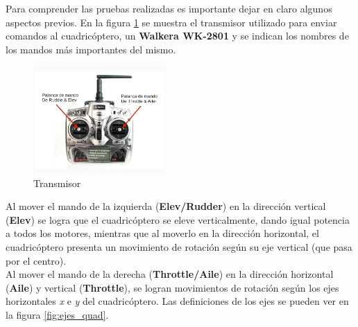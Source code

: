 \documentclass[spanish,12pt,a4paper,titlepage]{report}
\begin{document}
Para comprender las pruebas realizadas es importante dejar en claro algunos aspectos previos. En la figura \ref{fig:tx} se muestra el transmisor utilizado para enviar comandos al cuadricóptero, un \textbf{Walkera WK-2801} y se indican los nombres de los mandos más importantes del mismo.


\begin{figure}
	\vspace{-20pt}
	\begin{center}
	\includegraphics[width=0.45\textwidth]{./pics/tx.jpg}
	\end{center}
	\vspace{-25pt}
	\caption{Transmisor}
	\label{fig:tx}
	\vspace{20pt}
\end{figure}

Al mover el mando de la izquierda (\textbf{Elev/Rudder}) en la dirección vertical (\textbf{Elev}) se logra que el cuadricóptero se eleve verticalmente, dando igual potencia a todos los motores, mientras que al moverlo en la dirección horizontal, el cuadricóptero presenta un movimiento de rotación según su eje vertical (que pasa por el centro).\\

Al mover el mando de la derecha (\textbf{Throttle/Aile}) en la dirección horizontal (\textbf{Aile}) y vertical (\textbf{Throttle}), se logran movimientos de rotación según los ejes horizontales \emph{x} e \emph{y} del cuadricóptero. Las definiciones de los ejes se pueden ver en la figura \ref{fig:ejes_quad}.\\
\end{document}
